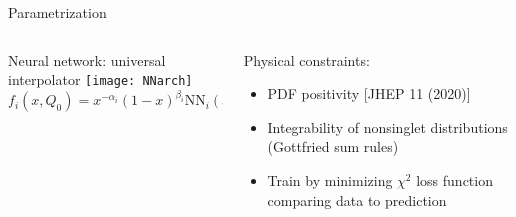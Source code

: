 \begin{frame}[t]{Parametrization}
  \begin{columns}[T]
      \begin{column}{0.48\textwidth}
        Neural network: universal interpolator
        \vspace*{0.3cm}
        \texttt{[image: NNarch]}
        \begin{equation*}
            f_{i}\left(x, Q_{0}\right)=x^{-\alpha_{i}}(1-x)^{\beta_{i}} \mathrm{NN}_{i}(x)
        \end{equation*}
      \end{column}
      \begin{column}{0.48\textwidth}
        Physical constraints:
        \begin{itemize}
            \item PDF positivity [JHEP 11 (2020)]
            \item Integrability of nonsinglet distributions (Gottfried sum rules)
        \end{itemize}
        \vspace*{0.3cm}
        \begin{itemize}
          \item Train by minimizing $\chi^2$ loss function comparing data to prediction\\
        \end{itemize}
      \end{column}
  \end{columns}
\end{frame}




